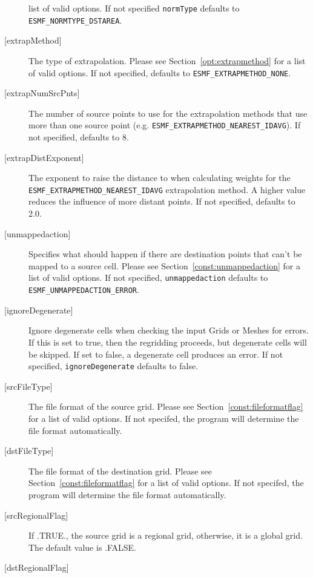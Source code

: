 \begin{description}
             list of valid options. If not specified {\tt normType} defaults to {\tt ESMF\_NORMTYPE\_DSTAREA}.
       \item [{[extrapMethod]}]
             The type of extrapolation. Please see Section~\ref{opt:extrapmethod}
             for a list of valid options. If not specified, defaults to
             {\tt ESMF\_EXTRAPMETHOD\_NONE}.
       \item [{[extrapNumSrcPnts]}]
             The number of source points to use for the extrapolation methods that use more than one source point
             (e.g. {\tt ESMF\_EXTRAPMETHOD\_NEAREST\_IDAVG}). If not specified, defaults to 8.
       \item [{[extrapDistExponent]}]
             The exponent to raise the distance to when calculating weights for
             the {\tt ESMF\_EXTRAPMETHOD\_NEAREST\_IDAVG} extrapolation method. A higher value reduces the influence
             of more distant points. If not specified, defaults to 2.0.
       \item [{[unmappedaction]}]
             Specifies what should happen if there are destination points that
             can't be mapped to a source cell. Please see Section~\ref{const:unmappedaction} for a
             list of valid options. If not specified, {\tt unmappedaction} defaults to {\tt ESMF\_UNMAPPEDACTION\_ERROR}.
       \item [{[ignoreDegenerate]}]
             Ignore degenerate cells when checking the input Grids or Meshes for errors. If this is set to true, then the
             regridding proceeds, but degenerate cells will be skipped. If set to false, a degenerate cell produces an error.
             If not specified, {\tt ignoreDegenerate} defaults to false.
     \item [{[srcFileType]}]
       The file format of the source grid. Please see
       Section~\ref{const:fileformatflag} for a list of valid options. 
        If not specifed, the program will determine the file format automatically.
     \item [{[dstFileType]}]
       The file format of the destination grid.  Please see Section~\ref{const:fileformatflag} for a list of valid options.
        If not specifed, the program will determine the file format automatically.
     \item [{[srcRegionalFlag]}]
       If .TRUE., the source grid is a regional grid, otherwise,
       it is a global grid.  The default value is .FALSE.
     \item [{[dstRegionalFlag]}]

\end{description}
